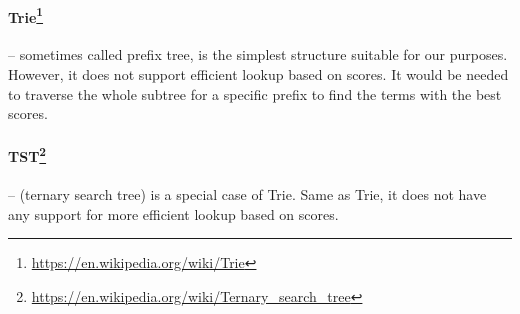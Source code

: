 \paragraph{Trie\protect\footnote{\url{https://en.wikipedia.org/wiki/Trie}}} – sometimes called prefix tree, is the simplest
structure suitable for our purposes. However, it does not support efficient lookup based on scores. It would
be needed to traverse the whole subtree for a specific prefix to find the terms with the best scores.

\paragraph{TST\protect\footnote{\url{https://en.wikipedia.org/wiki/Ternary\_search\_tree}}} – (ternary search tree) is a
special case of Trie. Same as Trie, it does not have any support for more efficient lookup based on scores.

